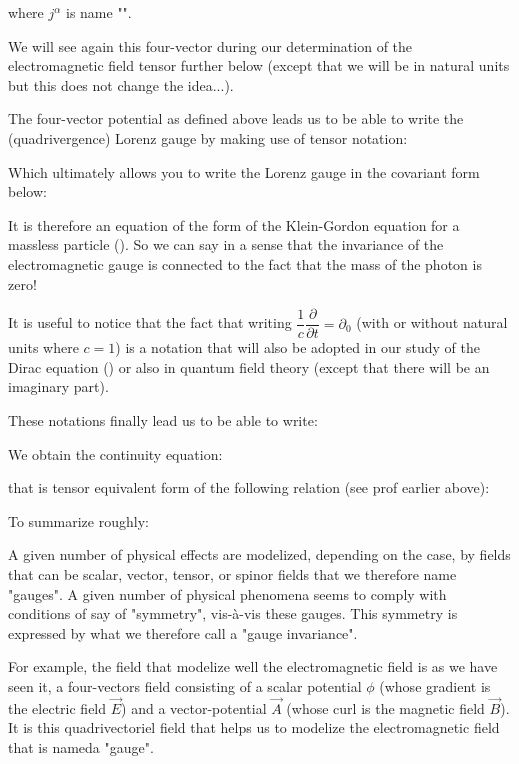 	where $j^\alpha$ is name "".
	\begin{tcolorbox}[title=Remark,colframe=black,arc=10pt]
	We will see again this four-vector during our determination of the electromagnetic field tensor further below (except that we will be in natural units but this does not change the idea...).
	\end{tcolorbox}
	The four-vector potential as defined above leads us to be able to write the (quadrivergence) Lorenz gauge by making use of tensor notation:
	
	Which ultimately allows you to write the Lorenz gauge in the covariant form below:
	
	It is therefore an equation of the form of the Klein-Gordon equation for a massless particle (). So we can say in a sense that the invariance of the electromagnetic gauge is connected to the fact that the mass of the photon is zero!
	\begin{tcolorbox}[title=Remark,colframe=black,arc=10pt]
	It is useful to notice that the fact that writing $\dfrac{1}{c}\dfrac{\partial }{\partial t}=\partial_0$ (with or without natural units where $c=1$) is a notation that will also be adopted in our study of the Dirac equation () or also in quantum field theory (except that there will be an imaginary part).
	\end{tcolorbox}
	These notations finally lead us to be able to write:
	
	We obtain the continuity equation:
	
	that is tensor equivalent form of the following relation (see prof earlier above):
	
	To summarize roughly:
	
	A given number of physical effects are modelized, depending on the case, by fields that can be scalar, vector, tensor, or spinor fields that we therefore name "gauges". A given number of physical phenomena seems to comply with conditions of say of "symmetry", vis-à-vis these gauges. This symmetry is expressed by what we therefore call a "gauge invariance".

	For example, the field that modelize well the electromagnetic field is as we have seen it, a four-vectors field consisting of a scalar potential $\phi$ (whose gradient is the electric field $\vec{E}$) and a vector-potential $\vec{A}$ (whose curl is the magnetic field $\vec{B}$). It is this quadrivectoriel field that helps us to modelize the electromagnetic field that is nameda "gauge".

